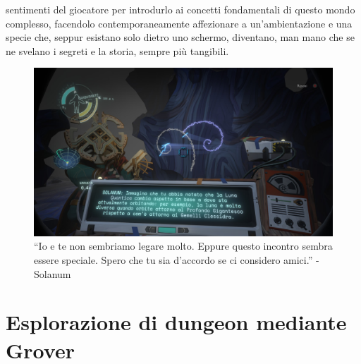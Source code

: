 \documentclass{book}
\theoremstyle{definition}
\theoremstyle{definition}
\theoremstyle{definition}
\theoremstyle{plain}
\theoremstyle{plain}
\theoremstyle{plain}
\theoremstyle{plain}
\begin{document}
sentimenti del giocatore per introdurlo ai concetti fondamentali di questo mondo complesso, facendolo contemporaneamente affezionare a un'ambientazione e una specie che, seppur esistano solo dietro uno schermo, diventano, man mano che se ne svelano i segreti e la storia, sempre più tangibili.
\begin{figure}[h!]
\captionsetup{font=scriptsize}
\begin{center}
    \includegraphics[width=1\textwidth]{Immagini troppo complicate/outer_wilds_1.jpg}
\end{center}
\caption{\scriptsize ``Io e te non sembriamo legare molto. Eppure questo incontro sembra essere speciale. Spero che tu sia d'accordo se ci considero amici.'' -Solanum}\label{fig:img_outer_wilds_1}
\end{figure}

\chapter{Esplorazione di dungeon mediante Grover} %
\end{document}
